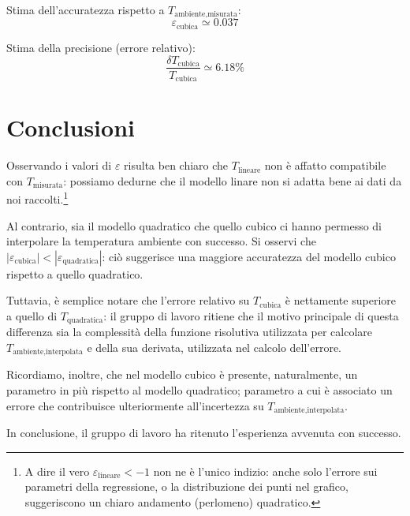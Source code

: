 \documentclass{article}
\begin{document}
Stima dell'accuratezza rispetto a $T_\text{ambiente,misurata}$:
\[ \varepsilon_\text{cubica} \simeq 0.037 \]

Stima della precisione (errore relativo):
\[ \frac{\delta T_\text{cubica}}{T_\text{cubica}} \simeq 6.18\% \]

\pagebreak
\section{Conclusioni}

Osservando i valori di $\varepsilon$ risulta ben chiaro che
$T_\text{lineare}$ non è affatto compatibile con $T_\text{misurata}$:
possiamo dedurne che il modello linare non si adatta bene ai dati da noi
raccolti.\footnote{
  A dire il vero $\varepsilon_\text{lineare} < -1$ non ne è l'unico indizio:
  anche solo l'errore sui parametri della regressione, o la distribuzione dei
  punti nel grafico, suggeriscono un chiaro andamento (perlomeno) quadratico.
}

\vspace{3mm}

Al contrario, sia il modello quadratico che quello cubico ci hanno
permesso di interpolare la temperatura ambiente con successo.
Si osservi che $|\varepsilon_\text{cubica}| < |\varepsilon_\text{quadratica}|$:
ciò suggerisce una maggiore accuratezza del modello cubico rispetto a quello
quadratico.

\vspace{3mm}

Tuttavia, è semplice notare che l'errore relativo su $T_\text{cubica}$ è
nettamente superiore a quello di $T_\text{quadratica}$: il gruppo di lavoro
ritiene che il motivo principale di questa differenza sia la complessità
della funzione risolutiva utilizzata per calcolare
$T_\text{ambiente,interpolata}$ e della sua derivata, utilizzata nel
calcolo dell'errore.

Ricordiamo, inoltre, che nel modello cubico è presente,
naturalmente, un parametro in più rispetto al modello quadratico; parametro
a cui è associato un errore che contribuisce ulteriormente all'incertezza su
$T_\text{ambiente,interpolata}$.

\vspace{3mm}

In conclusione, il gruppo di lavoro ha ritenuto l'esperienza avvenuta con
successo.
\end{document}
